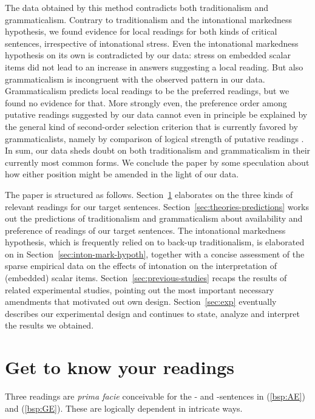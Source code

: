 \documentclass[fleqn,reqno,10pt,draft]{article}
\newcommand{\as}{\acro{as}}
\renewcommand{\es}{\acro{es}}
\begin{document}
The data obtained by this method contradicts both traditionalism and
grammaticalism. Contrary to traditionalism and the intonational
markedness hypothesis, we found evidence for local readings for both
kinds of critical sentences, irrespective of intonational stress. Even
the intonational markedness hypothesis on its own is contradicted by
our data: stress on embedded scalar items did not lead to an increase
in answers suggesting a local reading. But also grammaticalism is
incongruent with the observed pattern in our data.  Grammaticalism
predicts local readings to be the preferred readings, but we found no
evidence for that. More strongly even, the preference order among
putative readings suggested by our data cannot even in principle be
explained by the general kind of second-order selection criterion that
is currently favored by grammaticalists, namely by comparison of
logical strength of putative readings
\citep[e.g.][]{ChierchiaFox2008:The-Grammatical}. In sum, our data
sheds doubt on both traditionalism and grammaticalism in their
currently most common forms. We conclude the paper by some speculation
about how either position might be amended in the light of our data.


The paper is structured as follows. Section~\ref{sec:get-know-your}
elaborates on the three kinds of relevant readings for our target
sentences. Section~\ref{sec:theories-predictions} works out the
predictions of traditionalism and grammaticalism about availability
and preference of readings of our target sentences. The intonational
markedness hypothesis, which is frequently relied on to back-up
traditionalism, is elaborated on in
Section~\ref{sec:inton-mark-hypoth}, together with a concise
assessment of the sparse empirical data on the effects of intonation
on the interpretation of (embedded) scalar
items. Section~\ref{sec:previous-studies} recaps the results of
related experimental studies, pointing out the most important
necessary amendments that motivated out own
design. Section~\ref{sec:exp} eventually describes our experimental
design and continues to state, analyze and interpret the results we
obtained.

\section{Get to know your readings}
\label{sec:get-know-your}

Three readings are \emph{prima facie} conceivable for the \as- and
\es-sentences in (\ref{bsp:AE}) and (\ref{bsp:GE}). These are
logically dependent in intricate ways.
\end{document}

